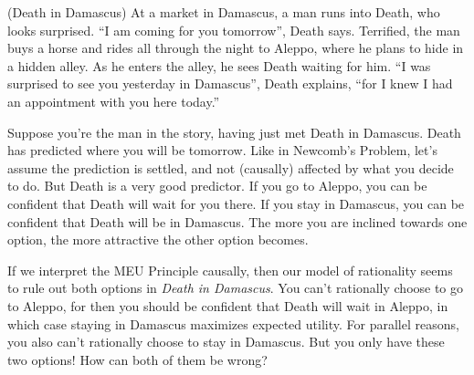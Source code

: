 \begin{example}(Death in Damascus)
  At a market in Damascus, a man runs into Death, who looks surprised. ``I am
  coming for you tomorrow'', Death says. Terrified, the man buys a horse and
  rides all through the night to Aleppo, where he plans to hide in a hidden
  alley. As he enters the alley, he sees Death waiting for him. ``I was
  surprised to see you yesterday in Damascus'', Death explains, ``for I knew I
  had an appointment with you here today.''
\end{example}

Suppose you're the man in the story, having just met Death in Damascus. Death
has predicted where you will be tomorrow. Like in Newcomb's Problem, let's
assume the prediction is settled, and not (causally) affected by what you decide
to do. But Death is a very good predictor. If you go to Aleppo, you can be
confident that Death will wait for you there. If you stay in Damascus, you can
be confident that Death will be in Damascus. The more you are inclined towards
one option, the more attractive the other option becomes.

If we interpret the MEU Principle causally, then our model of rationality seems
to rule out both options in \emph{Death in Damascus}. You can't rationally
choose to go to Aleppo, for then you should be confident that Death will wait in
Aleppo, in which case staying in Damascus maximizes expected utility. For
parallel reasons, you also can't rationally choose to stay in Damascus. But you
only have these two options! How can both of them be wrong?


